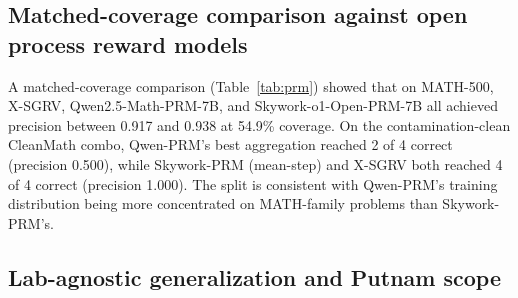 \documentclass{article}
\begin{document}
\subsection{Matched-coverage comparison against open process reward models}

A matched-coverage comparison (Table~\ref{tab:prm}) showed that on MATH-500, X-SGRV, Qwen2.5-Math-PRM-7B, and Skywork-o1-Open-PRM-7B all achieved precision between 0.917 and 0.938 at 54.9\% coverage. On the contamination-clean CleanMath combo, Qwen-PRM's best aggregation reached 2 of 4 correct (precision 0.500), while Skywork-PRM (mean-step) and X-SGRV both reached 4 of 4 correct (precision 1.000). The split is consistent with Qwen-PRM's training distribution being more concentrated on MATH-family problems than Skywork-PRM's.

\begin{table}[t]
\centering
\caption{\textbf{X-SGRV versus open process reward models at matched coverage.} For each PRM, score-per-problem is the maximum across 10 cached solver samples of the indicated step-aggregation. Each PRM is thresholded to the X-SGRV top-tier coverage on each benchmark, fixing $k$ accepted candidates. Aggregations reported: min-step, mean-step, product-step.}
\label{tab:prm}
\end{table}

\subsection{Lab-agnostic generalization and Putnam scope}
\end{document}
